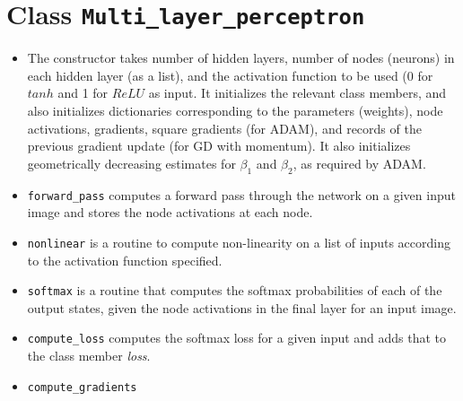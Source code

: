 \documentclass[12pt, a4paper]{article}
\begin{document}
\section{Class \texttt{Multi\_layer\_perceptron}}
\begin{itemize}
\item The constructor takes number of hidden layers, number of nodes (neurons) in each hidden layer (as a list), and the activation function to be used (0 for $tanh$ and 1 for $ReLU$ as input. It initializes the relevant class members, and also initializes dictionaries corresponding to the parameters (weights), node activations, gradients, square gradients (for ADAM), and records of the previous gradient update (for GD with momentum). It also initializes geometrically decreasing estimates for $\beta_1$ and $\beta_2$, as required by ADAM. 

\item \texttt{forward\_pass} computes a forward pass through the network on a given input image and stores the node activations at each node.

\item \texttt{nonlinear} is a routine to compute non-linearity on a list of inputs according to the activation function specified.

\item \texttt{softmax} is a routine that computes the softmax probabilities of each of the output states, given the node activations in the final layer for an input image. 

\item \texttt{compute\_loss} computes the softmax loss for a given input and adds that to the class member \textit{loss}.

\item \texttt{compute\_gradients}
 
 
\end{itemize}



\end{document}
